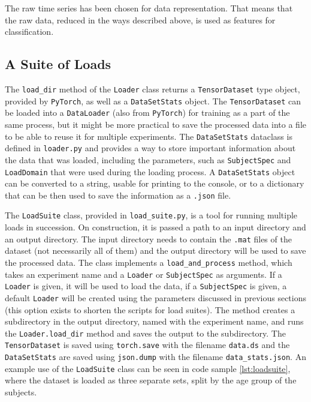 \documentclass[english, he, bc, kiv, iso690alph, viewonly]{fasthesis}
\begin{document}
The raw time series has been chosen for data representation. That means that the raw data, reduced in the ways described above, is used as features for classification.

\subsection{A Suite of Loads}

The \texttt{load\_dir} method of the \texttt{Loader} class returns a \texttt{TensorDataset} type object, provided by \texttt{PyTorch}, as well as a \texttt{DataSetStats} object. The \texttt{TensorDataset} can be loaded into a \texttt{DataLoader} (also from \texttt{PyTorch}) for training as a part of the same process, but it might be more practical to save the processed data into a file to be able to reuse it for multiple experiments. The \texttt{DataSetStats} dataclass is defined in \texttt{loader.py} and provides a way to store important information about the data that was loaded, including the parameters, such as \texttt{SubjectSpec} and \texttt{LoadDomain} that were used during the loading process. A \texttt{DataSetStats} object can be converted to a string, usable for printing to the console, or to a dictionary that can be then used to save the information as a \texttt{.json} file.

The \texttt{LoadSuite} class, provided in \texttt{load\_suite.py}, is a tool for running multiple loads in succession. On construction, it is passed a path to an input directory and an output directory. The input directory needs to contain the \texttt{.mat} files of the dataset (not necessarily all of them) and the output directory will be used to save the processed data.
The class implements a \texttt{load\_and\_process} method, which takes an experiment name and a \texttt{Loader} or \texttt{SubjectSpec} as arguments. If a \texttt{Loader} is given, it will be used to load the data, if a \texttt{SubjectSpec} is given, a default \texttt{Loader} will be created using the parameters discussed in previous sections (this option exists to shorten the scripts for load suites).
The method creates a subdirectory in the output directory, named with the experiment name, and runs the \texttt{Loader.load\_dir} method and saves the output to the subdirectory. The \texttt{TensorDataset} is saved using \texttt{torch.save} with the filename \texttt{data.ds} and the \texttt{DataSetStats} are saved using \texttt{json.dump} with the filename \texttt{data\_stats.json}. An example use of the \texttt{LoadSuite} class can be seen in code sample \ref{lst:loadsuite}, where the dataset is loaded as three separate sets, split by the age group of the subjects.
\end{document}
